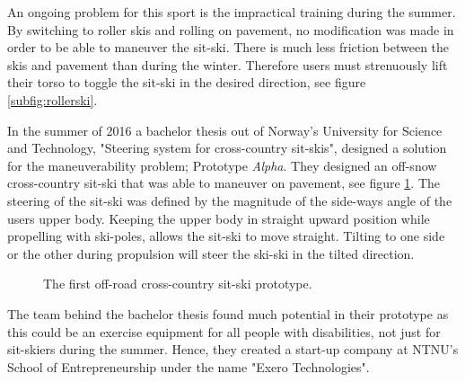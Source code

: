 An ongoing problem for this sport is the impractical training during the summer. By switching to roller skis and rolling on pavement, no modification was made in order to be able to maneuver the sit-ski. There is much less friction between the skis and pavement than during the winter. Therefore users must strenuously lift their torso to toggle the sit-ski in the desired direction, see figure \ref{subfig:rollerski}. 
\par
In the summer of 2016 a bachelor thesis out of Norway's University for Science and Technology, "Steering system for cross-country sit-skis", designed a solution for the maneuverability problem; Prototype \textit{Alpha}. They designed an off-snow cross-country sit-ski that was able to maneuver on pavement, see figure \ref{bachelorprototype}. The steering of the sit-ski was defined by the magnitude of the side-ways angle of the users upper body. Keeping the upper body in straight upward position while propelling with ski-poles, allows the sit-ski to move straight. Tilting to one side or the other during propulsion will steer the ski-ski in the tilted direction. 

\begin{figure}[htb!]
    \centering
    {\setlength{\fboxsep}{0pt}\setlength{\fboxrule}{1pt}
    }
    \captionsetup{justification=centering}
    \caption{The first off-road cross-country sit-ski prototype.}
    \label{bachelorprototype}
\end{figure}

The team behind the bachelor thesis found much potential in their prototype as this could be an exercise equipment for all people with disabilities, not just for sit-skiers during the summer. Hence, they created a start-up company at NTNU's School of Entrepreneurship under the name "Exero Technologies". 




